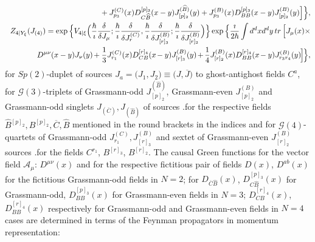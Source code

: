 \documentclass[10pt]{article}
\begin{document}
\begin{eqnarray}
&\hspace{-0.5em}& \hspace{-0.5em}  \phantom{Z_{3|\Psi_{\xi}}(\widetilde{J})=} +   J^{(C)}_{p_3}(x)D^{[p]_3}_{C\widehat{B}}(x-y)J^{(\widehat{B})}_{[p]_2}(y)+J^{(B)}_{p_3}(x)D^{[p]_3}_{BB}(x-y)J^{({B})}_{[p]_2}(y)   \Big] \Big\},\label{GFGFps3}\\
&\hspace{-0.5em}& \hspace{-0.5em}  \label{GFGFps4} Z_{4|Y_{\xi}}({J}_{(4)}) = \exp\Big\{V_{4|{\xi}}\Big(\frac{\hbar}{\imath} \frac{\delta}{\delta J_\mu};\frac{\hbar}{\imath} \frac{\delta}{\delta J^{(C)}_r},\frac{\hbar}{\imath} \frac{\delta}{\delta J^{({B})}_{[r]_3}}; \frac{\hbar}{\imath} \frac{\delta}{\delta J^{(B)}_{[r]_2}} \Big)\Big\}\exp\Big\{\frac{\imath}{2 \hbar} \int d^dx d^dy \,tr\, \Big[ J_{\mu}(x)\times \nonumber \\
&\hspace{-0.5em}& \hspace{-0.5em}  \phantom{Z_{4|Y_{\xi}}({J}_{(4)})} \hspace{-0.5em}  D^{\mu\nu}(x-y)J_{\nu}(y) \hspace{-0.1em}+ \frac{1}{3}J^{(C)}_{r_1}(x)D^{[r]_4}_{CB}(x\hspace{-0.1em}-y)J^{({B})}_{[r]_3}(y)\hspace{-0.1em}+\hspace{-0.1em}\frac{1}{4}J^{(B)}_{[r]_2}(x)
D^{[r]_4}_{BB}(x\hspace{-0.1em}-y)J^{({B})}_{r_3r_4}(y)    \hspace{-0.1em} \Big]\hspace{-0.1em} \Big\},
 \end{eqnarray}
for $Sp(2)$-duplet of  sources  $ J_a = \big( J_1, J_2\big) \equiv \big( J, \overline{J}\big)$ to ghost-antighost fields $C^a$, for  $\mathcal{G}(3)$-triplets of Grassmann-odd $ J^{(\widehat{B})}_{[p]_2}$, Grassmann-even $J^{({B})}_{[p]_2}$  and Grassmann-odd singlets $J_{(\overline{C})}, J_{(\widehat{B})}$ of sources .for the  respective fields $\widehat{B}{}^{[p]_2}, {B}{}^{[p]_2}, \overline{C}, \widehat{B}$ mentioned   in the round brackets in the indices and for $\mathcal{G}(4)$-quartets of Grassmann-odd $J^{(C)}_{r_1}, J^{({B})}_{[r]_3}$  and sextet of Grassmann-even $J^{(B)}_{[r]_2}$ sources .for the  fields ${C}^{r_1}$, ${B}^{[r]_3}$, ${B}^{[r]_2}$. The causal Green functions for the vector field $\mathcal{A}_\mu$: $D^{\mu\nu}(x)$ \cite{bookfaddeevslavnov} and for the respective fictitious pair of fields $D(x)$, $D^{ab}(x)$ for the fictitious Grassmann-odd fields in $N=2$;  for $D_{\overline{C}\widehat{B}}(x)$,  $D^{[p]_3}_{C\widehat{B}}(x)$ for Grassmann-odd,  $D^{[p]_3}_{BB}(x)$ for Grassmann-even   fields in $N=3$; $D^{[r]_4}_{CB}(x)$, $D^{[r]_4}_{BB}(x)$ respectively  for Grassmann-odd and Grassmann-even fields in $N=4$ cases are  determined  in terms of the Feynman propagators in momentum representation:
\end{document}
